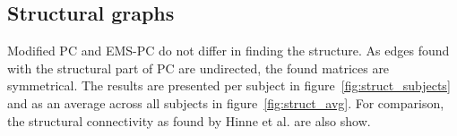 \documentclass[a4paper, 10pt, english, onecolumn]{article}
\begin{document}
\subsection{Structural graphs}
Modified PC and EMS-PC do not differ in finding the structure.
As edges found with the structural part of PC are undirected, the found matrices are symmetrical.
The results are presented per subject in figure~\ref{fig:struct_subjects} and as an average across all subjects in figure~\ref{fig:struct_avg}.
For comparison, the structural connectivity as found by Hinne et al.\cite{hinne2013} are also show. 
\end{document}

